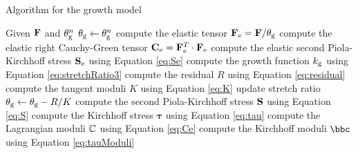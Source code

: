 \begin{algorithm}
	\caption{Algorithm for the growth model}  \label{algo}
	\begin{algorithmic}[1]
	\State Given $\bold{F}$ and $\theta_{\mathrm{g}}^n$
	\State $\theta_{\mathrm{g}} \leftarrow \theta_{\mathrm{g}}^n$
	\State compute the elastic tensor $\bold{F}_{\mathrm{e}} = \bold{F}/\theta_{\mathrm{g}}$
	\State compute the elastic right Cauchy-Green tensor $\bold{C}_{\mathrm{e}} = \bold{F}_{\mathrm{e}}^T\cdot\bold{F}_{\mathrm{e}}$
	\State compute the elastic second Piola-Kirchhoff stress $\bold{S}_{\mathrm{e}}$ using Equation \ref{eq:Se}
	\State compute the growth function $k_{\mathrm{g}}$ using Equation \ref{eq:stretchRatio3}
	\State compute the residual $R$ using Equation \ref{eq:residual}
	\State compute the tangent moduli $K$ using Equation \ref{eq:K}
	\State update stretch ratio $\theta_{\mathrm{g}} \leftarrow \theta_{\mathrm{g}} - R/K$
	\EndWhile
	\State compute the second Piola-Kirchhoff stress $\bold{S}$ using Equation \ref{eq:S}
	\State compute the Kirchhoff stress $\boldsymbol\tau$ using Equation \ref{eq:tau}
	\State compute the Lagrangian moduli $\mathbb{C}$ using Equation \ref{eq:Ce}
	\State compute the Kirchhoff moduli $\bbc$ using Equation \ref{eq:tauModuli}
	\end{algorithmic}
\end{algorithm}




